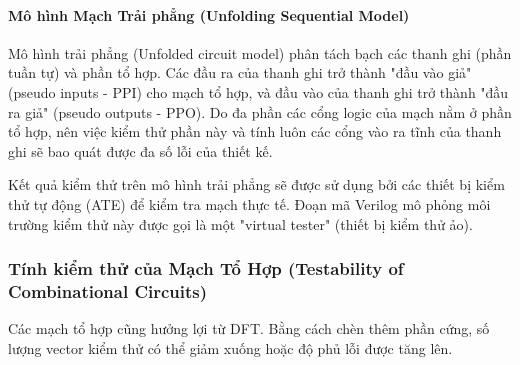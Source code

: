 \paragraph{Mô hình Mạch Trải phẳng (Unfolding Sequential Model)}
Mô hình trải phẳng (Unfolded circuit model) phân tách bạch các thanh ghi (phần tuần tự) và phần tổ hợp. Các đầu ra của thanh ghi trở thành "đầu vào giả" (pseudo inputs - PPI) cho mạch tổ hợp, và đầu vào của thanh ghi trở thành "đầu ra giả" (pseudo outputs - PPO). Do đa phần các cổng logic của mạch nằm ở phần tổ hợp, nên việc kiểm thử phần này và tính luôn các cổng vào ra tĩnh của thanh ghi sẽ bao quát được đa số lỗi của thiết kế.

Kết quả kiểm thử trên mô hình trải phẳng sẽ được sử dụng bởi các thiết bị kiểm thử tự động (ATE) để kiểm tra mạch thực tế. Đoạn mã Verilog mô phỏng môi trường kiểm thử này được gọi là một "virtual tester" (thiết bị kiểm thử ảo).

\subsubsection{Tính kiểm thử của Mạch Tổ Hợp (Testability of Combinational Circuits)}
Các mạch tổ hợp cũng hưởng lợi từ DFT. Bằng cách chèn thêm phần cứng, số lượng vector kiểm thử có thể giảm xuống hoặc độ phủ lỗi được tăng lên.
